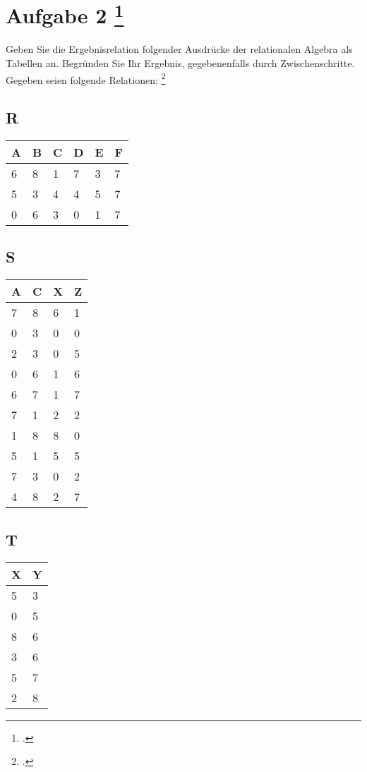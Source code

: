 \documentclass{lehramt-informatik-aufgabe}
\begin{document}
\section{Aufgabe 2
\footcite[Thema 2 Teilaufgabe 2 Aufgabe 2]{examen:46116:2018:09}}

Geben Sie die Ergebnisrelation folgender Ausdrücke der relationalen
Algebra als Tabellen an. Begründen Sie Ihr Ergebnis, gegebenenfalls
durch Zwischenschritte. Gegeben seien folgende Relationen:
\footcite[Seite 1, Aufgabe 1]{db:ab:3}

\bigskip

\begin{minipage}[t]{5cm}
\subsection*{R}
\begin{tabular}{llllll}
A & B & C & D & E & F \\\hline
6 & 8 & 1 & 7 & 3 & 7 \\
5 & 3 & 4 & 4 & 5 & 7 \\
0 & 6 & 3 & 0 & 1 & 7
\end{tabular}
\end{minipage}
%
\begin{minipage}[t]{3.8cm}
\subsection*{S}
\begin{tabular}{llll}
A & C & X & Z \\\hline
7 & 8 & 6 & 1 \\
0 & 3 & 0 & 0 \\
2 & 3 & 0 & 5 \\
0 & 6 & 1 & 6 \\
6 & 7 & 1 & 7 \\
7 & 1 & 2 & 2 \\
1 & 8 & 8 & 0 \\
5 & 1 & 5 & 5 \\
7 & 3 & 0 & 2 \\
4 & 8 & 2 & 7 \\
\end{tabular}
\end{minipage}
%
\begin{minipage}[t]{2cm}
\subsection*{T}
\begin{tabular}{ll}
X & Y \\\hline
5 & 3 \\
0 & 5 \\
8 & 6 \\
3 & 6 \\
5 & 7 \\
2 & 8 \\
\end{tabular}
\end{minipage}
\end{document}
